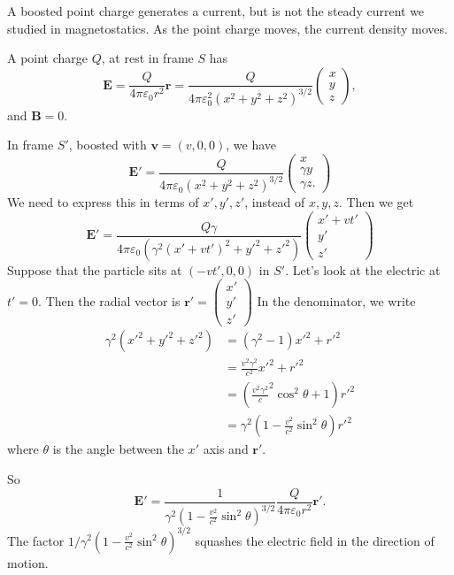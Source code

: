 \documentclass[a4paper]{article}
\begin{document}
\begin{eg}
  A boosted point charge generates a current, but is not the steady current we studied in magnetostatics. As the point charge moves, the current density moves.

  A point charge $Q$, at rest in frame $S$ has
  \[
    \mathbf{E} = \frac{Q}{4\pi \varepsilon_0 r^2}\hat{\mathbf{r}} = \frac{Q}{4\pi \varepsilon_0^2(x^2 + y^2 + z^2)^{3/2}}
    \begin{pmatrix}
      x\\y\\z
    \end{pmatrix},
  \]
  and $\mathbf{B} = 0$.

  In frame $S'$, boosted with $\mathbf{v} = (v, 0, 0)$, we have
  \[
    \mathbf{E}' = \frac{Q}{4\pi \varepsilon_0(x^2 + y^2 + z^2)^{3/2}}
    \begin{pmatrix}
      x\\ \gamma y\\ \gamma z.
    \end{pmatrix}
  \]
  We need to express this in terms of $x', y', z'$, instead of $x, y, z$. Then we get
  \[
    \mathbf{E}' = \frac{Q\gamma}{4\pi \varepsilon_0 (\gamma^2(x' + vt')^2 + y'^2 + z'^2)}
    \begin{pmatrix}
      x' + vt'\\y'\\z'
    \end{pmatrix}
  \]
  Suppose that the particle sits at $(-vt', 0, 0)$ in $S'$. Let's look at the electric at $t'=0$. Then the radial vector is $\mathbf{r}' =
  \begin{pmatrix}
    x'\\y'\\z'
  \end{pmatrix}
  $
  In the denominator, we write
  \begin{align*}
    \gamma^2(x'^2 + y'^2 + z'^2) &= (\gamma^2 - 1)x'^2 + r'^2\\
    &= \frac{v^2\gamma^2}{c^2}x'^2 + r'^2\\
    &= \left(\frac{v^2\gamma^2}c^2 \cos^2 \theta + 1\right)r'^2\\
    &= \gamma^2\left(1 - \frac{v^2}{c^2}\sin^2 \theta\right)r'^2
  \end{align*}
  where $\theta$ is the angle between the $x'$ axis and $\mathbf{r}'$.

  So
  \[
    \mathbf{E}' = \frac{1}{\gamma^2\left(1 - \frac{v^2}{c^2}\sin^2 \theta\right)^{3/2}}\frac{Q}{4\pi \varepsilon_0 r^2}\hat{\mathbf{r}'}.
  \]
  The factor $1/\gamma^2\left(1 - \frac{v^2}{c^2}\sin^2 \theta\right)^{3/2}$ squashes the electric field in the direction of motion.


\end{eg}
\end{document}
